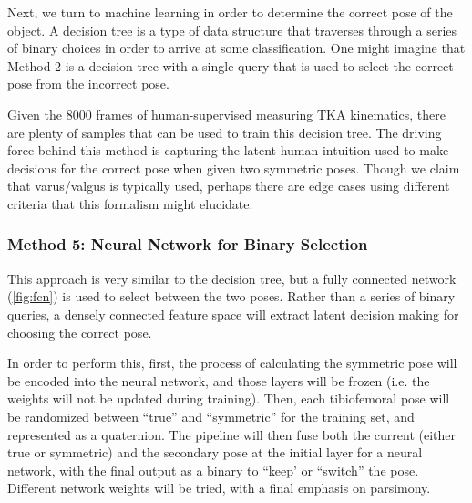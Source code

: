 Next, we turn to machine learning in order to determine the correct pose of the object. A decision tree is a type of data structure that traverses through a series of binary choices in order to arrive at some classification. One might imagine that Method 2 is a decision tree with a single query that is used to select the correct pose from the incorrect pose. 

Given the 8000 frames of human-supervised measuring TKA kinematics, there are plenty of samples that can be used to train this decision tree. The driving force behind this method is capturing the latent human intuition used to make decisions for the correct pose when given two symmetric poses. Though we claim that varus/valgus is typically used, perhaps there are edge cases using different criteria that this formalism might elucidate.

\subsubsection{Method 5: Neural Network for Binary Selection}
This approach is very similar to the decision tree, but a fully connected network (\cref{fig:fcn}) is used to select between the two poses. Rather than a series of binary queries, a densely connected feature space will extract latent decision making for choosing the correct pose.

In order to perform this, first, the process of calculating the symmetric pose will be encoded into the neural network, and those layers will be frozen (i.e. the weights will not be updated during training). Then, each tibiofemoral pose will be randomized between ``true'' and ``symmetric'' for the training set, and represented as a quaternion. The pipeline will then fuse both the current (either true or symmetric) and the secondary pose at the initial layer for a neural network, with the final output as a binary to ``keep' or ``switch'' the pose. Different network weights will be tried, with a final emphasis on parsimony.
